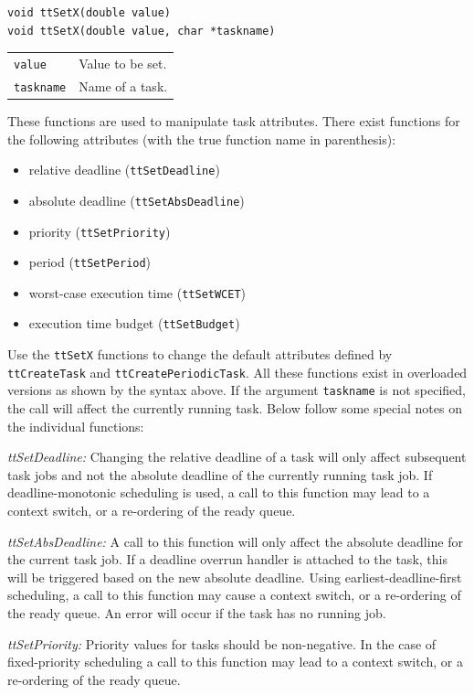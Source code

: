 \documentclass[final,twoside]{rapport}
\begin{document}
\Csyntax
\begin{verbatim}
void ttSetX(double value)
void ttSetX(double value, char *taskname)
\end{verbatim}

\args
\begin{tabularx}{\hsize}{l>{\raggedright\arraybackslash}X}
  {\tt value} & Value to be set. \\
  {\tt taskname} & Name of a task. 
\end{tabularx}

\descr These functions are used to manipulate task attributes. There
exist functions for the following attributes (with the true function name
in parenthesis):
\begin{itemize}
\item relative deadline (\texttt{ttSetDeadline})
\item absolute deadline (\texttt{ttSetAbsDeadline})
\item priority (\texttt{ttSetPriority})
\item period (\texttt{ttSetPeriod})
\item worst-case execution time (\texttt{ttSetWCET})
\item execution time budget (\texttt{ttSetBudget})
\end{itemize}

Use the \texttt{ttSetX} functions to change the default attributes
defined by \texttt{ttCreateTask} and \texttt{ttCreatePeriodicTask}.
All these functions exist in overloaded versions as shown by the
syntax above. If the argument \texttt{taskname} is not specified, the
call will affect the currently running task. Below follow some special
notes on the individual functions:

{\it ttSetDeadline:} Changing the relative deadline of a task will
only affect subsequent task jobs and not the absolute deadline of
the currently running task job. If deadline-monotonic scheduling
is used, a call to this function may lead to a context switch, or a
re-ordering of the ready queue.

{\it ttSetAbsDeadline:} A call to this function will only affect the
absolute deadline for the current task job. If a deadline overrun
handler is attached to the task, this will be triggered based on the
new absolute deadline. Using earliest-deadline-first scheduling, a
call to this function may cause a context switch, or a re-ordering of
the ready queue. An error will occur if the task has no running job.

{\it ttSetPriority:} Priority values for tasks should be non-negative. In
the case of fixed-priority scheduling a call to this function may lead
to a context switch, or a re-ordering of the ready queue.
\end{document}
